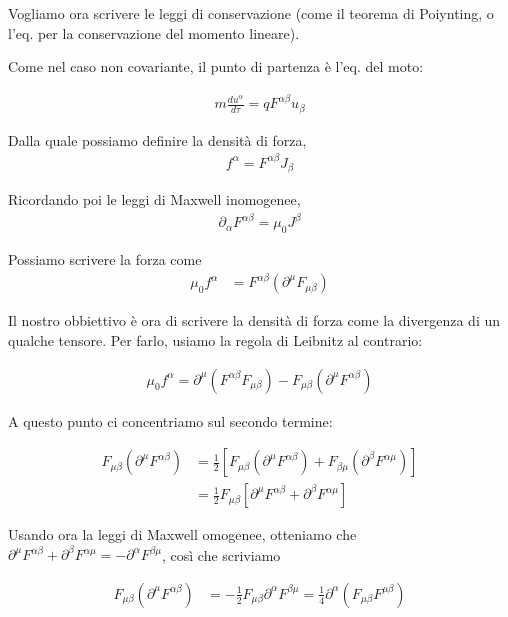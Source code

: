 \documentclass{report}
\begin{document}
Vogliamo ora scrivere le leggi di conservazione (come il teorema di Poiynting, o l'eq. per la conservazione del momento lineare). 

Come nel caso non covariante, il punto di partenza è l'eq. del moto: 

\begin{align}
    m \frac{d u^\alpha}{d\tau} = q F^{\alpha \beta}u_{\beta}
\end{align}

Dalla quale possiamo definire la densità di forza, 
\begin{align}
    f^\alpha = F^{\alpha \beta}J_{\beta}
\end{align}

Ricordando poi le leggi di Maxwell inomogenee, 
\begin{align}
    \partial_\alpha F^{\alpha \beta} = \mu_0 J^{\beta}
\end{align}

Possiamo scrivere la forza come 
\begin{align}
    \mu_0f^\alpha &= F^{\alpha \beta}(\partial^\mu F_{\mu \beta})
\end{align}

Il nostro obbiettivo è ora di scrivere la densità di forza come la divergenza di un qualche tensore. Per farlo, usiamo la regola di Leibnitz al contrario: 

\begin{align}
    \mu_0 f^\alpha = \partial^{\mu}(F^{\alpha \beta}F_{\mu \beta}) - F_{\mu \beta}(\partial ^{\mu}F^{\alpha \beta})
\end{align}

A questo punto ci concentriamo sul secondo termine: 

\begin{align}
    F_{\mu \beta}(\partial^{\mu}F^{\alpha\beta}) &= \frac{1}{2}[F_{\mu \beta}(\partial^{\mu}F^{\alpha\beta}) + F_{\beta \mu}(\partial^{\beta}F^{\alpha\mu})] \\
    &= \frac{1}{2}F_{\mu \beta}[\partial^{\mu}F^{\alpha\beta} + \partial^{\beta}F^{\alpha\mu}]
\end{align}

Usando ora la leggi di Maxwell omogenee, otteniamo che \(\partial^{\mu}F^{\alpha\beta} + \partial^{\beta}F^{\alpha\mu} =-\partial^{\alpha}F^{\beta\mu}\), così che scriviamo 

\begin{align}
    F_{\mu \beta}(\partial^{\mu}F^{\alpha\beta}) &= -\frac{1}{2}F_{\mu\beta}\partial^{\alpha}F^{\beta \mu} = \frac{1}{4}\partial^{\alpha}(F_{\mu\beta}F^{\mu\beta})
\end{align}
\end{document}
